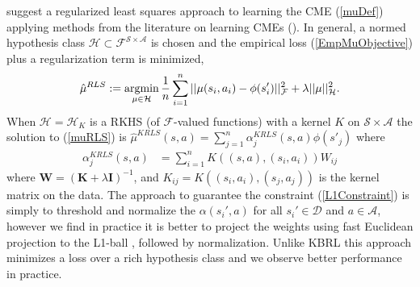 \documentclass[letterpaper]{article}
\newcommand{\GrunewalderEmbeddingsRL}{GrunewalderEmbeddingsMDP}
\newcommand{\GrunewalderEmbeddingsRegression}{GrunewalderEmbeddingsRegression}
\newcommand{\SongNonparametric}{DBLP:journals/jmlr/SongGG10}
\newcommand{\OrmoneitKBRL}{DBLP:journals/ml/OrmoneitS02}
\newcommand{\DuchiProjections}{DBLP:conf/icml/DuchiSSC08}
\newcommand{\TibshiraniLasso}{tibshirani96regression}
\newcommand{\cD}{{\mathcal D}}
\newcommand{\cH}{{\mathcal H}}
\newcommand{\cF}{{\mathcal F}}
\newcommand{\cA}{{\mathcal A}}
\newcommand{\cS}{{\mathcal S}}
\newcommand{\balpha}{{\bm \alpha}}
\newcommand{\bbeta}{{\bm \beta}}
\newcommand{\bK}{{\bm K}}
\newcommand{\bW}{{\bm W}}
\newcommand{\bI}{{\bm I}}
\newcommand{\E}{{\mathbb E}}
\newcommand{\R}{{\mathbb R}}
\newcommand{\argmin}{\operatornamewithlimits{argmin}}
\newcommand{\nn}{\nonumber}
\begin{document}
\cite{\GrunewalderEmbeddingsRL} suggest a regularized least squares approach to learning the CME (\ref{muDef}) applying methods from the literature on learning CMEs (\cite{\SongNonparametric,\GrunewalderEmbeddingsRegression}). In general, a normed hypothesis class $\cH\subset \cF^{\cS\times\cA}$ is chosen and the empirical loss (\ref{EmpMuObjective}) plus a regularization term is minimized,
\begin{align}
\hat\mu^{RLS} := \argmin_{\mu\in\cH}  \frac{1}{n}\sum_{i=1}^n || \mu (s_i,a_i) - \phi(s'_i) ||_\cF^2 +\lambda ||\mu||^2_{\cH} . \label{muRLS}
\end{align}
When $\cH=\cH_K$ is a RKHS (of $\cF$-valued functions) with a kernel $K$ on $\cS\times\cA$ the solution to (\ref{muRLS}) is $\hat\mu^{KRLS}(s,a) = \sum_{j=1}^n \alpha_j^{KRLS}(s,a) \phi(s'_j)$ where
\begin{align}
\alpha_j^{KRLS}(s,a) &=  \sum_{i=1}^n K((s,a),(s_i,a_i)) W_{ij}  \label{KRLSalphas}
\end{align}
where $\bW = (\bK + \lambda \bI)^{-1}$, and $K_{ij} = K((s_i,a_i),(s_j,a_j))$ is the kernel matrix on the data. The approach to guarantee the constraint (\ref{L1Constraint}) is simply to threshold and normalize the $\alpha(s_i',a)$ for all $s_i'\in\cD$ and $a\in\cA$, however we find in practice it is better to project the weights using fast Euclidean projection to the L1-ball \citep[e.g.][]{\DuchiProjections}, followed by normalization.%
Unlike KBRL \citep{\OrmoneitKBRL} this approach minimizes a loss over a rich hypothesis class and we observe better performance in practice.
\end{document}
